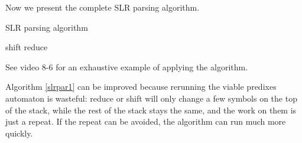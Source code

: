 Now we present the complete SLR parsing algorithm.
\begin{algorithm}[ht]
\caption{SLR parsing algorithm}\label{slrpar1}
\begin{algorithmic}
\Repeat
	\Else 
		 shift
		 reduce
		 \EndIf
	\EndIf
{}
\end{algorithmic}
\end{algorithm}

See video 8-6 for an exhaustive example of applying the algorithm.

Algorithm \eqref{slrpar1} can be improved because rerunning the viable predixes automaton is wasteful: reduce or shift will only change a few symbols on the top of the stack, while the rest of the stack stays the same, and the work on them is just a repeat. If the repeat can be avoided, the algorithm can run much more quickly. 

